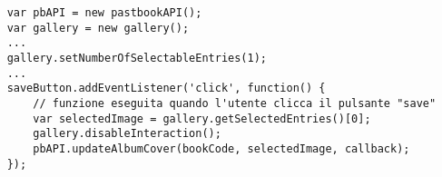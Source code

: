 \begin{lstlisting}
	var pbAPI = new pastbookAPI();
	var gallery = new gallery();
	...
	gallery.setNumberOfSelectableEntries(1);
	...
	saveButton.addEventListener('click', function() {
		// funzione eseguita quando l'utente clicca il pulsante "save"
		var selectedImage = gallery.getSelectedEntries()[0];
		gallery.disableInteraction();
		pbAPI.updateAlbumCover(bookCode, selectedImage, callback);
	});
\end{lstlisting}
